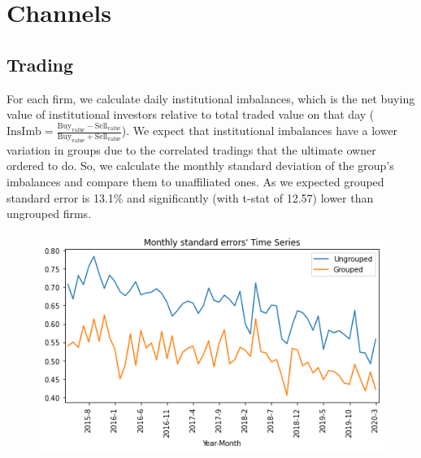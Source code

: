 \documentclass[12pt, a4paper]{article}
\begin{document}
\newpage

\section*{Channels} 
\subsection*{Trading}
 
For each firm, we calculate daily institutional imbalances, which is the net buying value of institutional investors relative to total traded value on that day ($ \text{InsImb} = \frac{\text{Buy}_{\text{value}} - \text{Sell}_{\text{value}}}{\text{Buy}_{\text{value}} + \text{Sell}_{\text{value}}} $). 
We expect that institutional imbalances have a lower variation in groups due to the correlated tradings that the ultimate owner ordered to do. So, we calculate the monthly standard deviation of the group's imbalances and compare them to unaffiliated ones. As we expected grouped standard error is  13.1\% and significantly (with t-stat of 12.57) lower than ungrouped firms. 

\begin{table}[htbp]
	\centering
	\label{tab:addlabel}%
\end{table}%



\begin{figure}[htbp]
	\centering
	\includegraphics[width=0.8\linewidth]{GroupedSTD}
	\label{fig:groupedstd}
\end{figure}
\end{document}
